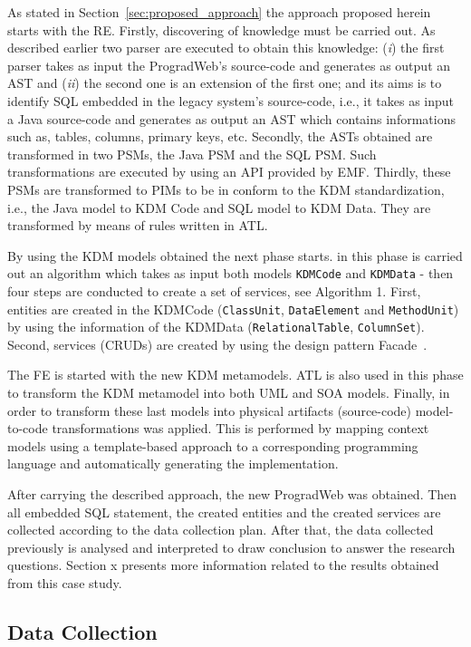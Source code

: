 \documentclass[a4paper,twoside]{article}
\begin{document}
As stated in Section~\ref{sec:proposed_approach} the approach proposed herein starts with the RE. Firstly, discovering of knowledge must be carried out. As described earlier two parser are executed to obtain this knowledge: (\textit{i}) the first parser takes as input the ProgradWeb's source-code and generates as output an AST and (\textit{ii}) the second one is an extension of the first one; and its aims is to identify SQL embedded in the legacy system's source-code, i.e., it takes as input a Java source-code and generates as output an AST which contains informations such as, tables, columns, primary keys, etc. Secondly, the ASTs obtained are transformed in two PSMs, the Java PSM and the SQL PSM. Such transformations are executed by using an API provided by EMF. Thirdly, these PSMs are transformed to PIMs to be in conform to the KDM standardization, i.e., the Java model to KDM Code and SQL model to KDM Data. They are transformed by means of rules written in ATL. 


By using the KDM models obtained the next phase starts. in this phase is carried out an algorithm which takes as input both models \texttt{KDMCode} and \texttt{KDMData} - then four steps are conducted to create a set of services, see Algorithm 1. First, entities are created in the KDMCode (\texttt{ClassUnit}, \texttt{DataElement} and \texttt{MethodUnit}) by using the information of the KDMData (\texttt{RelationalTable}, \texttt{ColumnSet}). Second, services (CRUDs) are created by using the design pattern Facade~\cite{Gamma1994}.

The FE is started with the new KDM metamodels. ATL is also used in this phase to transform the KDM metamodel into both UML and SOA models. Finally, in order to transform these last models into physical artifacts (source-code) model-to-code transformations was applied. This is performed by mapping context models using a template-based approach to a corresponding
programming language and automatically generating the implementation.

After carrying the described approach, the new ProgradWeb was obtained. Then all embedded SQL statement, the created entities and the created services are collected according to the data collection plan. After that, the data collected previously is analysed and interpreted to draw conclusion to answer the research questions. Section x presents more information related to the results obtained from this case study.

\subsection{Data Collection} %
\label{sub:data_collection}
\end{document}
